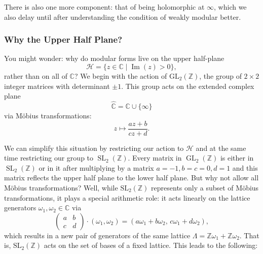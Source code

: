 \documentclass{article}
\theoremstyle{definition}
\theoremstyle{definition}
\theoremstyle{definition}
\newcommand{\GL}{\operatorname{GL}}
\newcommand{\SL}{\operatorname{SL}}
\newcommand{\Z}{\mathbb{Z}}
\begin{document}
There is also one more component: that of being holomorphic at $\infty$, which we also delay until after understanding the condition of weakly modular better.


\subsubsection{Why the Upper Half Plane?}
You might wonder: why do modular forms live on the upper half-plane 
\[
\mathcal{H} = \{ z \in \mathbb{C} \mid \operatorname{Im}(z) > 0 \},
\]
rather than on all of \( \mathbb{C} \)?
\newline\newline
We begin with the action of \( \mathrm{GL}_2(\mathbb{Z}) \), the group of \( 2 \times 2 \) integer matrices with determinant \( \pm 1 \). This group acts on the extended complex plane 
\[
\widehat{\mathbb{C}} = \mathbb{C} \cup \{\infty\}
\]
via Möbius transformations:
\[
z \mapsto \frac{az + b}{cz + d}.
\]

We can simplify this situation by restricting our action to $\mathcal{H}$ and at the same time restricting our group to $\SL_2(\Z)$. Every matrix in $\GL_2(\Z)$ is either in $\SL_2(\Z)$ or in it after multiplying by a matrix $a=-1,b=c=0, d=1$ and this matrix reflects the upper half plane to the lower half plane.
\newline\newline
But why not allow all Möbius transformations?
\newline\newline
Well, while \( \mathrm{SL}_2(\mathbb{Z}) \) represents only a subset of Möbius transformations, it plays a special arithmetic role: it acts linearly on the lattice generators \( \omega_1, \omega_2 \in \mathbb{C} \) via
\[
\begin{pmatrix}
a & b \\
c & d
\end{pmatrix}
\cdot (\omega_1, \omega_2) = (a\omega_1 + b\omega_2,\, c\omega_1 + d\omega_2),
\]
which results in a new pair of generators of the same lattice \( \Lambda = \mathbb{Z}\omega_1 + \mathbb{Z}\omega_2 \). That is, \( \mathrm{SL}_2(\mathbb{Z}) \) acts on the set of bases of a fixed lattice. This leads to the following:
\end{document}
